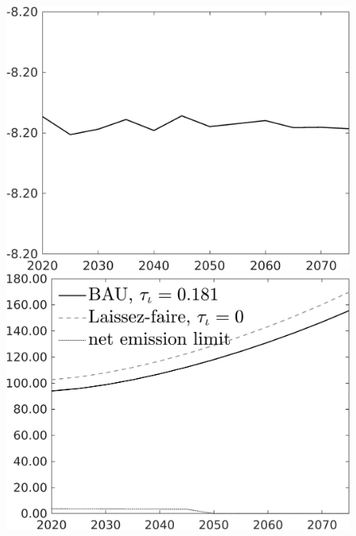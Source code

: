 \documentclass[12pt]{article}
\begin{document}
\begin{figure}[h!!]
\begin{minipage}[]{0.32\textwidth}
	\end{minipage}	
	\begin{minipage}[]{0.32\textwidth}
		\includegraphics[width=1\textwidth]{../../codding_model/own_basedOnFried/optimalPol_010922_revision/figures/all_13Sept22/CompTaul_Equlab_LFBAUPer_Reg0_C_spillover0_nsk1_xgr0_knspil0_sep1_countec0_GovRev0_etaa0.79.png}
	\end{minipage}	
	\begin{minipage}[]{0.32\textwidth}
		\includegraphics[width=1\textwidth]{../../codding_model/own_basedOnFried/optimalPol_010922_revision/figures/all_13Sept22/CompTaul_Equlab_LFBAU_Reg0_Emnet_spillover0_nsk1_xgr0_knspil0_sep1_countec0_GovRev0_etaa0.79_lgd1.png}

\end{minipage}
\end{figure}
\end{document}
